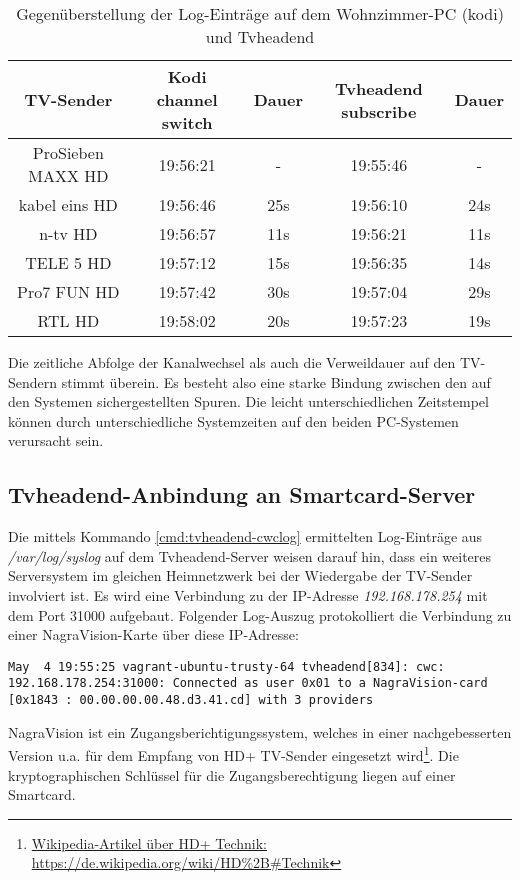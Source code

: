 \begin{table}[H]
\begin{tabular}{ccccc}
\hline 
TV-Sender & Kodi channel switch & Dauer & Tvheadend subscribe & Dauer \\ 
\hline 
ProSieben MAXX HD & 19:56:21 & - & 19:55:46 & - \\ 
\hline 
kabel eins HD & 19:56:46 & 25s & 19:56:10 & 24s \\ 
\hline 
n-tv HD & 19:56:57 & 11s & 19:56:21 & 11s \\ 
\hline 
TELE 5 HD & 19:57:12 & 15s & 19:56:35 & 14s \\ 
\hline 
Pro7 FUN HD & 19:57:42 & 30s & 19:57:04 & 29s \\ 
\hline 
RTL HD & 19:58:02 & 20s & 19:57:23 & 19s \\ 
\hline 
\end{tabular}
\caption{Gegenüberstellung der Log-Einträge auf dem Wohnzimmer-PC (kodi) und Tvheadend}
\label{table:tvheadend-logcompare}
\end{table}

Die zeitliche Abfolge der Kanalwechsel als auch die Verweildauer auf den TV-Sendern stimmt überein. Es besteht also eine starke Bindung zwischen den auf den Systemen sichergestellten Spuren. Die leicht unterschiedlichen Zeitstempel können durch unterschiedliche Systemzeiten auf den beiden PC-Systemen verursacht sein.

\subsection{Tvheadend-Anbindung an Smartcard-Server}

Die mittels Kommando \autoref{cmd:tvheadend-cwclog} ermittelten Log-Einträge aus \textit{/var/log/syslog} auf dem Tvheadend-Server weisen darauf hin, dass ein weiteres Serversystem im gleichen Heimnetzwerk bei der Wiedergabe der TV-Sender involviert ist. Es wird eine Verbindung zu der IP-Adresse  \textit{192.168.178.254} mit dem Port 31000 aufgebaut. Folgender Log-Auszug protokolliert die Verbindung zu einer NagraVision-Karte über diese IP-Adresse:

\begin{Verbatim}[fontsize=\tiny]
May  4 19:55:25 vagrant-ubuntu-trusty-64 tvheadend[834]: cwc: 192.168.178.254:31000: Connected as user 0x01 to a NagraVision-card [0x1843 : 00.00.00.00.48.d3.41.cd] with 3 providers
\end{Verbatim}

NagraVision ist ein Zugangsberichtigungssystem, welches in einer nachgebesserten Version u.a. für dem Empfang von HD+ TV-Sender eingesetzt wird\footnote{\href{https://de.wikipedia.org/wiki/HD\%2B\#Technik}{Wikipedia-Artikel über HD+ Technik: https://de.wikipedia.org/wiki/HD\%2B\#Technik}}. Die kryptographischen Schlüssel für die Zugangsberechtigung liegen auf einer Smartcard.

